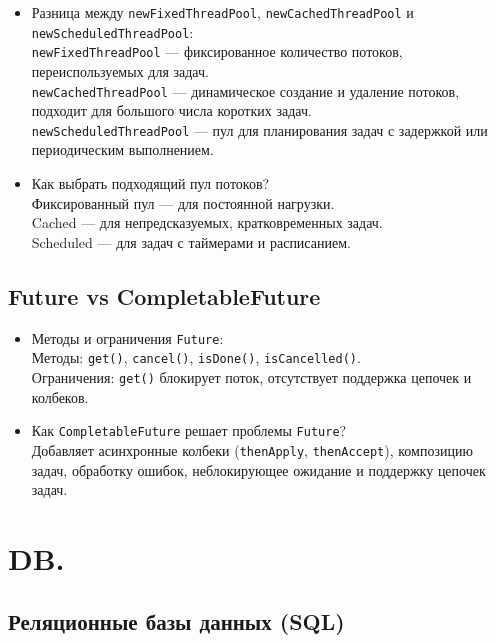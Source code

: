 \documentclass[a4paper,14pt]{article}
\begin{document}
\begin{itemize}
\item Разница между \texttt{newFixedThreadPool}, \texttt{newCachedThreadPool} и \texttt{newScheduledThreadPool}: \\
\texttt{newFixedThreadPool} — фиксированное количество потоков, переиспользуемых для задач. \\
\texttt{newCachedThreadPool} — динамическое создание и удаление потоков, подходит для большого числа коротких задач. \\
\texttt{newScheduledThreadPool} — пул для планирования задач с задержкой или периодическим выполнением.

\item Как выбрать подходящий пул потоков? \\
Фиксированный пул — для постоянной нагрузки. \\
Cached — для непредсказуемых, кратковременных задач. \\
Scheduled — для задач с таймерами и расписанием.
\end{itemize}

\subsection{Future vs CompletableFuture}

\begin{itemize}
\item Методы и ограничения \texttt{Future}: \\
Методы: \texttt{get()}, \texttt{cancel()}, \texttt{isDone()}, \texttt{isCancelled()}. \\
Ограничения: \texttt{get()} блокирует поток, отсутствует поддержка цепочек и колбеков.

\item Как \texttt{CompletableFuture} решает проблемы \texttt{Future}? \\
Добавляет асинхронные колбеки (\texttt{thenApply}, \texttt{thenAccept}), композицию задач, обработку ошибок, неблокирующее ожидание и поддержку цепочек задач.
\end{itemize}

\section{DB.}

\subsection{Реляционные базы данных (SQL)}
\end{document}
